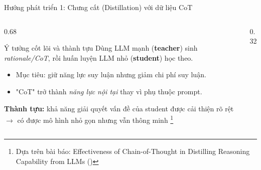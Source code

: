 \begin{frame}{Hướng phát triển 1: Chưng cất (Distillation) với dữ liệu CoT}
    \begin{columns}
        \begin{column}{0.68\textwidth}
            \begin{block}{Ý tưởng cốt lõi và thành tựu}
            Dùng LLM mạnh (\textbf{teacher}) sinh \textit{rationale/CoT}, rồi huấn luyện LLM nhỏ (\textbf{student}) học theo.
            \begin{itemize}
                \item Mục tiêu: \alert{giữ năng lực suy luận} nhưng \alert{giảm chi phí suy luận}.
                \item "CoT" trở thành \textit{năng lực nội tại} thay vì phụ thuộc prompt.
            \end{itemize}
            \textbf{Thành tựu:} khả năng giải quyết vấn đề của student được cải thiện rõ rệt $\rightarrow$ có được mô hình nhỏ gọn nhưng vẫn thông minh \footnote{Dựa trên bài báo: Effectiveness of Chain-of-Thought in Distilling Reasoning Capability from LLMs (\cite{Do2025})}

            \end{block}
        \end{column}
        
        \begin{column}{0.32\textwidth}
            \centering
        \end{column}
    \end{columns}
    
    \vspace{0.3cm}
\end{frame}

